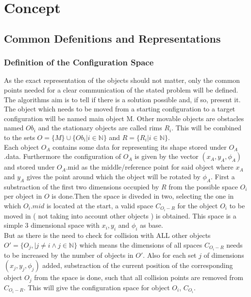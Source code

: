 \chapter{Concept}
\section{Common Defenitions and Representations}
\subsection{Definition of the Configuration Space}
As the exact representation of the objects should not matter,  only the common points needed for a clear communication of the stated problem will be defined.\\
The algorithms aim is to tell if there is a solution possible and, if so, present it. The object which needs to be moved from a starting configuration to a target configuration will be named main object M. Other movable objects are obstacles named $Ob_i$  and the stationary objects are called rims $R_i$. This will be combined to the sets $O = \{M\}  \cup \{Ob_i | i \in \mathbb{N} \} $ and $ R = \{ R_i | i \in \mathbb{N}\}$.\\

Each object $O_A$ contains some data for representing its shape stored under $O_A$.data. Furthermore the configuration of $O_A$ is given by the vector $( x_A,y_A,\phi_A )$ and stored under $O_A$.mid as the middle/reference point for said object where $x_A$ and $y_A$ gives the point around which the object will be rotated by $\phi_A$.
First a substraction of the first two dimensions occupied by $R$ from the possible space $O_i$ per object in $O$ is done.Then the space is diveded in two, selecting the one in which $O_i.mid$ is located at the start, a valid space $C_{O_i-R}$ for the object $O_i$ to be moved in ( not taking into account other objects ) is obtained. This space is a simple 3 dimensional space with $x_i, y_i$ and $\phi_i$ as base.\\
But as there is the need to check for collision with ALL other objects $O' = \{O_j, | j\neq i \wedge j \in \mathbb{N}\} $ which means the dimensions of all spaces $C_{O_i-R}$ needs to be increased by the number of objects in $O'$. Also for each set $j$ of dimensions $(x_j,y_j,\phi_j)$  added, substraction of the current position of the corresponding object $O_j$ from the space is done, such that all collision points are removed from $C_{O_i-R}$. This will give the configuration space for object $O_i$, $C_{O_i}$.


